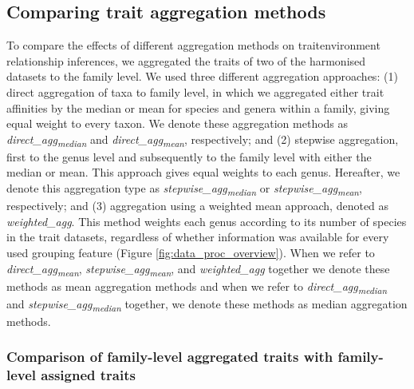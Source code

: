 \documentclass[12pt]{article}
\begin{document}

\newpage

\subsection*{Comparing trait aggregation methods}

To compare the effects of different aggregation methods on trait\-environment relationship inferences, we aggregated the traits of two of the harmonised datasets to the family level. We used three different aggregation approaches: (1) direct aggregation of taxa to family level, in which we aggregated either trait affinities by the median or mean for species and genera within a family, giving equal weight to every taxon. We denote these aggregation methods as \textit{direct\_agg\textsubscript{median}} and \textit{direct\_agg\textsubscript{mean}}, respectively; and (2) stepwise aggregation, first to the genus level and subsequently to the family level with either the median or mean. This approach gives equal weights to each genus. Hereafter, we denote this aggregation type as \textit{stepwise\_agg\textsubscript{median}} or \textit{stepwise\_agg\textsubscript{mean}}, respectively; and (3) aggregation using a weighted mean approach, denoted as \textit{weighted\_agg}. This method weights each genus according to its number of species in the trait datasets, regardless of whether information was available for every used grouping feature (Figure \ref{fig:data_proc_overview}). When we refer to \textit{direct\_agg\textsubscript{mean}}, \textit{stepwise\_agg\textsubscript{mean}}, and \textit{weighted\_agg} together we denote these methods as mean aggregation methods and when we refer to \textit{direct\_agg\textsubscript{median}} and \textit{stepwise\_agg\textsubscript{median}} together, we denote these methods as median aggregation methods.


\subsubsection*{Comparison of family-level aggregated traits with family-level assigned traits}
\end{document}
